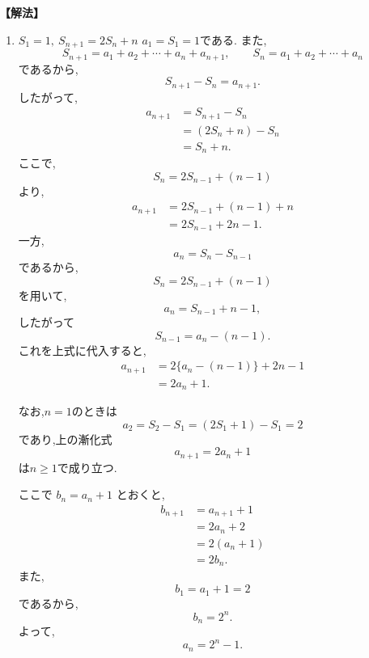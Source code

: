\noindent\textbf{【解法】}
\begin{enumerate}[label=(\arabic*),parsep=3pt]
  \item $\displaystyle S_1=1,\ S_{n+1}=2S_n+n$
        $a_1=S_1=1$である.
        また,
        \[
          S_{n+1}=a_1+a_2+\cdots+a_n+a_{n+1},
          \qquad
          S_n=a_1+a_2+\cdots+a_n
        \]
        であるから,
        \[
          S_{n+1}-S_n=a_{n+1}.
        \]
        したがって,
        \begin{align*}
          a_{n+1}
           & =S_{n+1}-S_n  \\
           & =(2S_n+n)-S_n \\
           & =S_n+n.
        \end{align*}
        ここで,
        \[
          S_n=2S_{n-1}+(n-1)
        \]
        より,
        \begin{align*}
          a_{n+1}
           & =2S_{n-1}+(n-1)+n \\
           & =2S_{n-1}+2n-1.
        \end{align*}
        一方,
        \[
          a_n=S_n-S_{n-1}
        \]
        であるから,
        \[
          S_n=2S_{n-1}+(n-1)
        \]
        を用いて,
        \[
          a_n=S_{n-1}+n-1,
        \]
        したがって
        \[
          S_{n-1}=a_n-(n-1).
        \]
        これを上式に代入すると,
        \begin{align*}
          a_{n+1}
           & =2\{a_n-(n-1)\}+2n-1 \\
           & =2a_n+1.
        \end{align*}

        なお,$n=1$のときは
        \[
          a_2=S_2-S_1=(2S_1+1)-S_1=2
        \]
        であり,上の漸化式
        \[
          a_{n+1}=2a_n+1
        \]
        は$n\ge1$で成り立つ.

        ここで $b_n=a_n+1$ とおくと,
        \begin{align*}
          b_{n+1}
           & =a_{n+1}+1 \\
           & =2a_n+2    \\
           & =2(a_n+1)  \\
           & =2b_n.
        \end{align*}
        また,
        \[
          b_1=a_1+1=2
        \]
        であるから,
        \[
          b_n=2^n.
        \]
        よって,
        \[
          a_n=2^n-1.
        \]
\end{enumerate}
